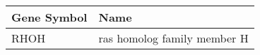 \begin{tabular}{ll}
\toprule
Gene Symbol &                        Name \\
\midrule
       RHOH & ras homolog family member H \\
\bottomrule
\end{tabular}
